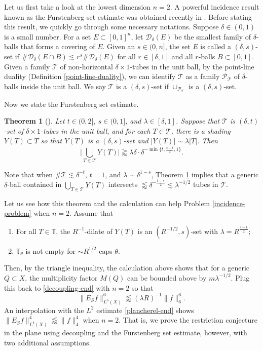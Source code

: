 \documentclass{amsart}
\numberwithin{equation}{section}
\newtheorem{theorem}{Theorem}[section]
\newcommand{\de}{\delta}
\newcommand{\la}{\lambda}
\newcommand{\cp}{\mathcal P}
\newcommand{\cd}{\mathcal D}
\newcommand{\ZT}{\mathbb{T}}
\newcommand{\cT}{{\mathcal T}}
\begin{document}
\smallskip

Let us first take a look at the lowest dimension $n=2$. A powerful incidence result known as the Furstenberg set estimate was obtained recently in \cite{Orponen-Shmerkin-2,ren2023furstenberg}. 
Before stating this result, we quickly go through some necessary notations.
Suppose $\de\in(0,1)$ is a small number. 
For a set $E\subset [0,1]^n$, let $\cd_\de(E)$ be the smallest family of $\de$-balls that forms a covering of $E$. 
Given an $s\in(0,n]$, the set $E$ is called a $(\de,s)$-set if $\#\cd_\de(E\cap B)\lesssim r^s\#\cd_\de(E)$ for all $r\in[\de,1]$ and all $r$-balls $B\subset[0,1]$. 
Given a family $\cT$ of non-horizontal $\delta\times1$-tubes in the unit ball, by the point-line duality (Definition \ref{point-line-duality}), we can identify $\cT$ as a family $\cp_\cT$ of $\de$-balls inside the unit ball. 
We say $\cT$ is a $(\de,s)$-set if $\cup_{\cp_\cT}$ is a $(\de,s)$-set.

Now we state the Furstenberg set estimate.

\begin{theorem}[\cite{ren2023furstenberg}]
\label{furstenberg-thm}
Let $t\in(0,2]$, $s\in(0,1]$, and $\la\in[\de,1]$. 
Suppose that $\cT$ is $(\de,t)$-set of $\de\times1$-tubes in the unit ball, and for each $T\in\cT$, there is a shading $Y(T)\subset T$ so that $Y(T)$ is a $(\de,s)$-set and $|Y(T)|\sim\la |T|$. 
Then 
\begin{equation}
    \big|\bigcup_{T\in\cT} Y(T)\big|\gtrapprox \la\de\cdot\de^{-\min\{t,\frac{s+t}{2},1\}}.
\end{equation}
\end{theorem}

\noindent Note that when $\#\cT\lesssim\de^{-t}$, $t=1$, and $\la\sim\de^{1-s}$, Theorem \ref{furstenberg-thm} implies that a generic $\de$-ball contained in $\bigcup_{T\in\cT}Y(T)$ intersects $\lessapprox \de^{-\frac{1-s}{2}}\lesssim\la^{-1/2}$ tubes in $\cT$. 

\smallskip

Let us see how this theorem and the calculation can help Problem \ref{incidence-problem} when $n=2$.
Assume that
\begin{enumerate}
    \item For all $T\in\ZT$, the $R^{-1}$-dilate of $Y(T)$ is an $(R^{-1/2},s)$-set with $\la=R^{\frac{s-1}{2}}$;
    \item $\ZT_\theta$ is not empty for $\sim R^{1/2}$ caps $\theta$.
\end{enumerate}
Then, by the triangle inequality, the calculation above shows that for a generic $Q\subset X$, the multiplicity factor $M(Q)$ can be bounded above by $m\la^{-1/2}$. 
Plug this back to \eqref{decoupling-end} with $n=2$ so that
\begin{equation}
    \|E_Sf\|_{L^6(X)}^6\lessapprox (\la R)^{-1}\|f\|_6^6.
\end{equation} 
An interpolation with the $L^2$ estimate \eqref{plancherel-end} shows $\|E_Sf\|_{L^4(X)}^4\lessapprox \|f\|_4^4$ when $n=2$. 
That is, we prove the restriction conjecture in the plane using decoupling and the Furstenberg set estimate, however, with two additional assumptions.
\end{document}
